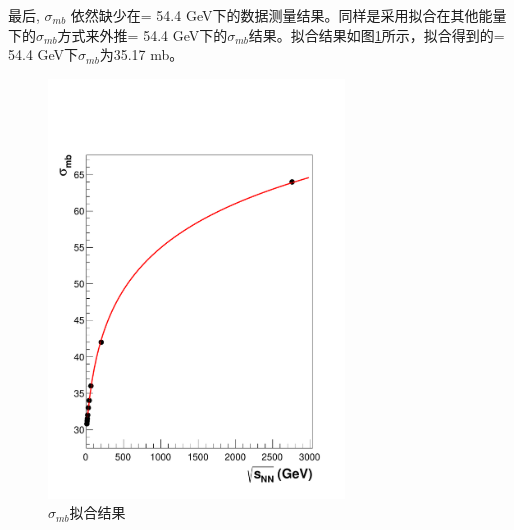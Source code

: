 最后, $\sigma_{mb}$ 依然缺少在\sNN = 54.4 GeV下的数据测量结果。同样是采用拟合在其他能量下的$\sigma_{mb}$方式来外推\sNN = 54.4 GeV下的$\sigma_{mb}$结果。拟合结果如图\ref{fig:mbXSecFit}所示，拟合得到的\sNN = 54.4 GeV下$\sigma_{mb}$为35.17 mb。
\begin{figure}[htb!]
    \begin{center}
    \includegraphics[width=0.7\textwidth,clip]{figures/Chapter4/mbXSecFit.pdf}
    \end{center}
    \caption[$\sigma_{mb}$拟合结果]{$\sigma_{mb}$拟合结果}
    \label{fig:mbXSecFit}
\end{figure}


